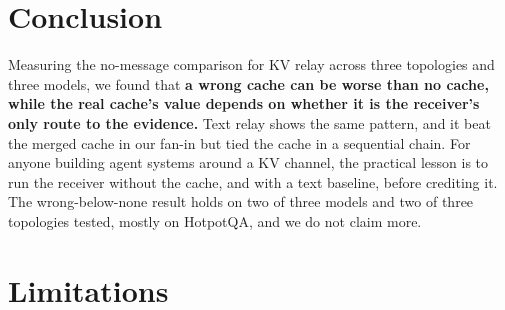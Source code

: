 \documentclass[11pt]{article}
\begin{document}
\section{Conclusion}

Measuring the no-message comparison for KV relay across three topologies and
three models, we found that \textbf{a wrong cache can be worse than no cache,
while the real cache's value depends on whether it is the receiver's only route
to the evidence.} Text relay shows the same pattern, and it beat the merged cache
in our fan-in but tied the cache in a sequential chain. For
anyone building agent systems around a KV channel, the practical lesson is to
run the receiver without the cache, and with a text baseline, before crediting it.
The wrong-below-none result holds on two of three models and two of three
topologies tested, mostly on HotpotQA, and we do not claim more.

\section*{Limitations}
\label{sec:limitations}
\end{document}
